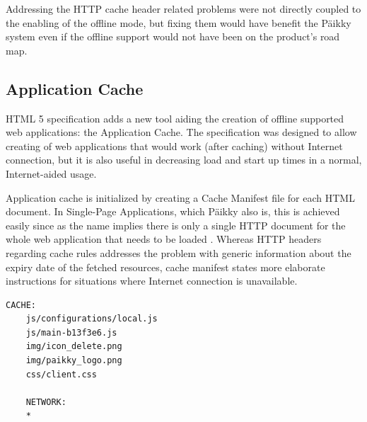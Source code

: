 Addressing the HTTP cache header related problems were not directly coupled to the enabling of the offline mode, but fixing them would have benefit the Päikky system even if the offline support would not have been on the product's road map.







\subsection{Application Cache}
\label{subsec:appcache}


HTML 5 specification adds a new tool aiding the creation of offline supported web applications: the Application Cache. The specification was designed to allow creating of web applications that would work (after caching) without Internet connection, but it is also useful in decreasing load and start up times in a normal, Internet-aided usage. 

Application cache is initialized by creating a Cache Manifest file for each HTML document. In Single-Page Applications, which Päikky also is, this is achieved easily since as the name implies there is only a single HTTP document for the whole web application that needs to be loaded \cite{_html_????}.  Whereas HTTP headers regarding cache rules addresses the problem with generic information about the expiry date of the fetched resources, cache manifest states more elaborate instructions for situations where Internet connection is unavailable. \cite{qian_web_2012}

\begin{lstlisting}[caption={Snippet of Päikky's Cache Manifest},label={lst:manifest}]
    CACHE:
    js/configurations/local.js
    js/main-b13f3e6.js
    img/icon_delete.png
    img/paikky_logo.png
    css/client.css

    NETWORK:
    *
\end{lstlisting} %

